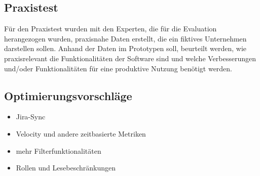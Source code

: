 \subsection{Praxistest}
Für den Praxistest wurden mit den Experten, die für die Evaluation herangezogen wurden, praxisnahe Daten erstellt, die ein fiktives Unternehmen darstellen sollen. Anhand der Daten im Prototypen soll, beurteilt werden, wie praxisrelevant die Funktionalitäten der Software sind und welche Verbesserungen und/oder Funktionalitäten für eine produktive Nutzung benötigt werden.

\subsection{Optimierungsvorschläge}
\begin{itemize}
    \item Jira-Sync
    \item Velocity und andere zeitbasierte Metriken
    \item mehr Filterfunktionalitäten
    \item Rollen und Lesebeschränkungen
\end{itemize}